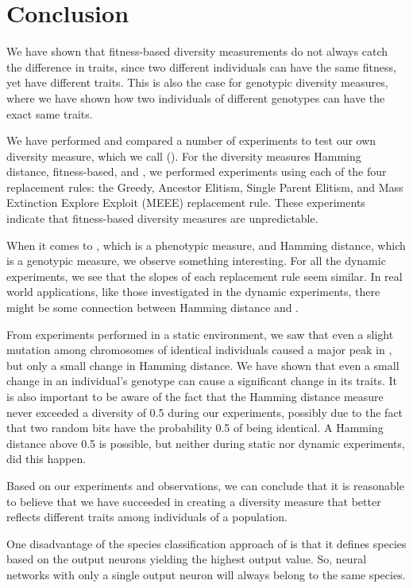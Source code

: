 \section{Conclusion}\label{sec:conclusion}
We have shown that fitness-based diversity measurements do not always catch the difference in traits, since two different individuals can have the same fitness, yet have different traits. This is also the case for genotypic diversity measures, where we have shown how two individuals of different genotypes can have the exact same traits.

We have performed and compared a number of experiments to test our own diversity measure, which we call \di{} (\dia{}). For the diversity measures Hamming distance, fitness-based, and \dia{}, we performed experiments using each of the four replacement rules: the Greedy, Ancestor Elitism, Single Parent Elitism, and Mass Extinction Explore Exploit (MEEE) replacement rule. These experiments indicate that fitness-based diversity measures are unpredictable.

When it comes to \dia{}, which is a phenotypic measure, and Hamming distance, which is a genotypic measure, we observe something interesting. For all the dynamic experiments, we see that the slopes of each replacement rule seem similar. In real world applications, like those investigated in the dynamic experiments, there might be some connection between Hamming distance and \dia{}.

From experiments performed in a static environment, we saw that even a slight mutation among chromosomes of identical individuals caused a major peak in \dia{}, but only a small change in Hamming distance. We have shown that even a small change in an individual's genotype can cause a significant change in its traits. It is also important to be aware of the fact that the Hamming distance measure never exceeded a diversity of \num{0.5} during our experiments, possibly due to the fact that two random bits have the probability \num{0.5} of being identical. A Hamming distance above \num{0.5} is possible, but neither during static nor dynamic experiments, did this happen. 

Based on our experiments and observations, we can conclude that it is reasonable to believe that we have succeeded in creating a diversity measure that better reflects different traits among individuals of a population.

One disadvantage of the species classification approach of \dia{} is that it defines species based on the output neurons yielding the highest output value. So, neural networks with only a single output neuron will always belong to the same species.

